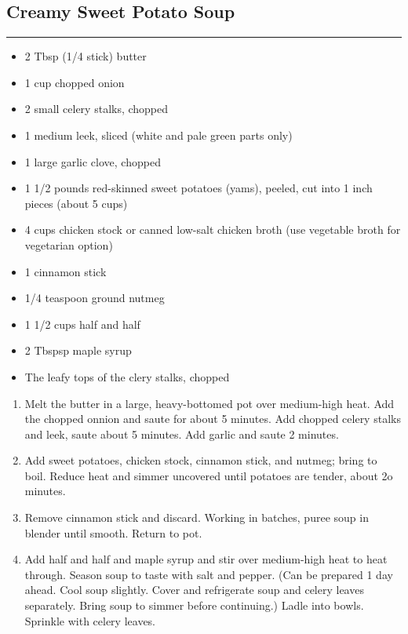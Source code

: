\documentclass{article}
\begin{document}
\subsection{Creamy Sweet Potato Soup} 
\noindent\rule[0.5ex]{\linewidth}{1pt}

\begin{framed}
    \begin{itemize}
        \item 2 Tbsp (1/4 stick) butter
        \item 1 cup chopped onion
        \item 2 small celery stalks, chopped
        \item 1 medium leek, sliced (white and pale green parts only)
        \item 1 large garlic clove, chopped
        \item 1 1/2 pounds red-skinned sweet potatoes (yams), peeled, cut into 1 inch pieces (about 5 cups)
        \item 4 cups chicken stock or canned low-salt chicken broth (use vegetable broth for vegetarian option)
        \item 1 cinnamon stick
        \item 1/4 teaspoon ground nutmeg
        \item 1 1/2 cups half and half
        \item 2 Tbspsp maple syrup
        \item The leafy tops of the clery stalks, chopped
    \end{itemize}
\end{framed}

\begin{enumerate}
    \item 
        Melt the butter in a large, heavy-bottomed pot over medium-high heat. Add the chopped onnion and saute for about 5 minutes. Add chopped celery stalks and leek, saute about 5 minutes. Add garlic and saute 2 minutes.
    \item
        Add sweet potatoes, chicken stock, cinnamon stick, and nutmeg; bring to boil. Reduce heat and simmer uncovered until potatoes are tender, about 2o minutes.
    \item
        Remove cinnamon stick and discard. Working in batches, puree soup in blender until smooth. Return to pot.
    \item 
        Add half and half and maple syrup and stir over medium-high heat to heat through. Season soup to taste with salt and pepper. (Can be prepared 1 day ahead. Cool soup slightly. Cover and refrigerate soup and celery leaves separately. Bring soup to simmer before continuing.) Ladle into bowls. Sprinkle with celery leaves.
\end{enumerate}
\newpage
\end{document}
